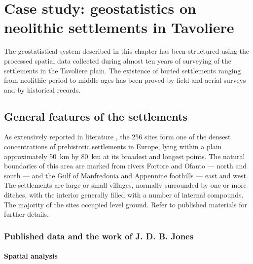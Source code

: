 \chapter{Case study: geostatistics on neolithic settlements in Tavoliere}

    \begin{chaptersum}
        \blindtext[2]
    \end{chaptersum}

    The geostatistical system described in this chapter has been structured using the processed spatial data collected during almost ten years of surveying of the settlements in the Tavoliere plain. The existence of buried settlements ranging from neolithic period to middle ages has been proved by field and aerial surveys and by historical records.

    \section{General features of the settlements}
        As extensively reported in literature \cite{intro-tavoliere}, the 256 sites form one of the densest concentrations of prehistoric settlements in Europe, lying within a plain approximately \SI{50}{\kilo\meter} by \SI{80}{\kilo\meter} at its broadest and longest points. The natural boundaries of this area are marked from rivers Fortore and Ofanto --- north and south --- and the Gulf of Manfredonia and Appennine foothills --- east and west.\\
        The settlements are large or small villages, normally surrounded by one or more ditches, with the interior generally filled with a number of internal compounds. The majority of the sites occupied level ground. Refer to published materials for further details.

        \subsection{Published data and the work of J. D. B. Jones\label{sec:jones}}

            \subsubsection{Spatial analysis}

        \pagebreak
